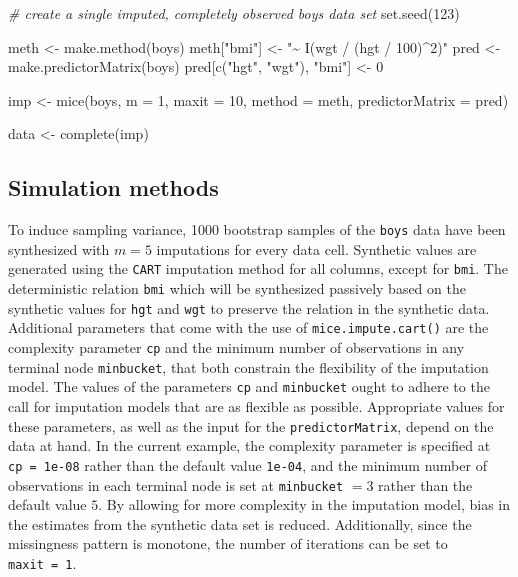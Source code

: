 \documentclass[psych,article,submit,moreauthors,pdftex]{mdpi}
\newenvironment{Shaded}{\begin{snugshade}}{\end{snugshade}}
\newcommand{\AttributeTok}[1]{\textcolor[rgb]{0.77,0.63,0.00}{#1}}
\newcommand{\CommentTok}[1]{\textcolor[rgb]{0.56,0.35,0.01}{\textit{#1}}}
\newcommand{\DecValTok}[1]{\textcolor[rgb]{0.00,0.00,0.81}{#1}}
\newcommand{\FunctionTok}[1]{\textcolor[rgb]{0.00,0.00,0.00}{#1}}
\newcommand{\NormalTok}[1]{#1}
\newcommand{\OtherTok}[1]{\textcolor[rgb]{0.56,0.35,0.01}{#1}}
\newcommand{\StringTok}[1]{\textcolor[rgb]{0.31,0.60,0.02}{#1}}
\begin{document}
\begin{Shaded}
\begin{Highlighting}[]
\CommentTok{\# create a single imputed, completely observed \textasciigrave{}boys\textasciigrave{} data set}
\FunctionTok{set.seed}\NormalTok{(}\DecValTok{123}\NormalTok{)}

\NormalTok{meth }\OtherTok{\textless{}{-}} \FunctionTok{make.method}\NormalTok{(boys)}
\NormalTok{meth[}\StringTok{"bmi"}\NormalTok{] }\OtherTok{\textless{}{-}} \StringTok{"\textasciitilde{} I(wgt / (hgt / 100)\^{}2)"}
\NormalTok{pred }\OtherTok{\textless{}{-}} \FunctionTok{make.predictorMatrix}\NormalTok{(boys)}
\NormalTok{pred[}\FunctionTok{c}\NormalTok{(}\StringTok{"hgt"}\NormalTok{, }\StringTok{"wgt"}\NormalTok{), }\StringTok{"bmi"}\NormalTok{] }\OtherTok{\textless{}{-}} \DecValTok{0}

\NormalTok{imp }\OtherTok{\textless{}{-}} \FunctionTok{mice}\NormalTok{(boys, }
            \AttributeTok{m =} \DecValTok{1}\NormalTok{,}
            \AttributeTok{maxit =} \DecValTok{10}\NormalTok{,}
            \AttributeTok{method =}\NormalTok{ meth,}
            \AttributeTok{predictorMatrix =}\NormalTok{ pred)}

\NormalTok{data }\OtherTok{\textless{}{-}} \FunctionTok{complete}\NormalTok{(imp)}
\end{Highlighting}
\end{Shaded}

\hypertarget{simulation-methods}{%
\subsection{Simulation methods}\label{simulation-methods}}

To induce sampling variance, 1000 bootstrap samples of the \texttt{boys}
data have been synthesized with \(m = 5\) imputations for every data
cell. Synthetic values are generated using the \texttt{CART} imputation
method for all columns, except for \texttt{bmi}. The deterministic
relation \texttt{bmi} which will be synthesized passively based on the
synthetic values for \texttt{hgt} and \texttt{wgt} to preserve the
relation in the synthetic data. Additional parameters that come with the
use of \texttt{mice.impute.cart()} are the complexity parameter
\texttt{cp} and the minimum number of observations in any terminal node
\texttt{minbucket}, that both constrain the flexibility of the
imputation model. The values of the parameters \texttt{cp} and
\texttt{minbucket} ought to adhere to the call for imputation models
that are as flexible as possible. Appropriate values for these
parameters, as well as the input for the \texttt{predictorMatrix},
depend on the data at hand. In the current example, the complexity
parameter is specified at \texttt{cp\ =\ 1e-08} rather than the default
value \texttt{1e-04}, and the minimum number of observations in each
terminal node is set at \texttt{minbucket} \(= 3\) rather than the
default value \(5\). By allowing for more complexity in the imputation
model, bias in the estimates from the synthetic data set is reduced.
Additionally, since the missingness pattern is monotone, the number of
iterations can be set to \texttt{maxit\ =\ 1}.
\end{document}
